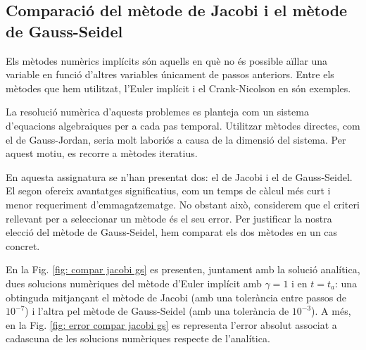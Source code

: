 \documentclass[11pt]{article}
\begin{document}
\subsection{Comparació del mètode de Jacobi i el mètode de Gauss-Seidel}
\label{subsec: comparacio jacobi gs}

Els mètodes numèrics implícits són aquells en què no és possible aïllar una variable en funció d'altres variables únicament de passos anteriors. Entre els mètodes que hem utilitzat, l’Euler implícit i el Crank-Nicolson en són exemples.

La resolució numèrica d’aquests problemes es planteja com un sistema d’equacions algebraiques per a cada pas temporal. Utilitzar mètodes directes, com el de Gauss-Jordan, seria molt laboriós a causa de la dimensió del sistema. Per aquest motiu, es recorre a mètodes iteratius.

En aquesta assignatura se n'han presentat dos: el de Jacobi i el de Gauss-Seidel. El segon ofereix avantatges significatius, com un temps de càlcul més curt i menor requeriment d'emmagatzematge. No obstant això, considerem que el criteri rellevant per a seleccionar un mètode és el seu error. Per justificar la nostra elecció del mètode de Gauss-Seidel, hem comparat els dos mètodes en un cas concret.

En la Fig. \ref{fig: compar jacobi gs} es presenten, juntament amb la solució analítica, dues solucions numèriques del mètode d'Euler implícit amb $\gamma=1$ i en $t=t_a$: una obtinguda mitjançant el mètode de Jacobi (amb una tolerància entre passos de $10^{-7}$) i l'altra pel mètode de Gauss-Seidel (amb una tolerància de $10^{-3}$). A més, en la Fig. \ref{fig: error compar jacobi gs} es representa l'error absolut associat a cadascuna de les solucions numèriques respecte de l'analítica.
\end{document}
